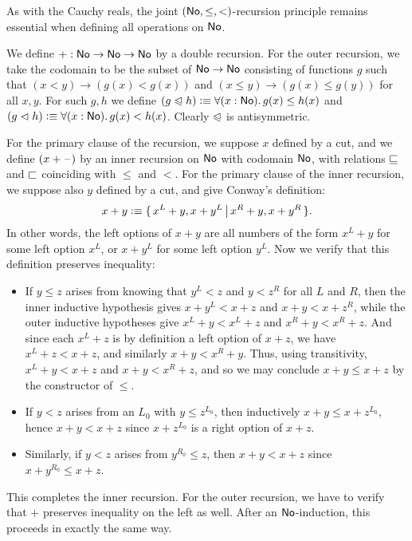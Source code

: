 As with the Cauchy reals, the joint $(\mathsf{No},\le,<)$-recursion principle remains essential when defining all operations on $\mathsf{No}$.

\begin{eg}
We define $\mathord+:\mathsf{No}\to\mathsf{No}\to\mathsf{No}$ by a double recursion.
For the outer recursion, we take the codomain to be the subset of $\mathsf{No}\to\mathsf{No}$ consisting of functions $g$ such that $(x<y) \to (g(x)<g(x))$ and $(x\le y) \to (g(x)\le g(y))$ for all $x,y$.
For such $g,h$ we define $(g\ble h)\defeq \fall{x:\NO} g(x)\le h(x)$ and $(g\blt h)\defeq \fall{x:\NO} g(x)< h(x)$.
Clearly $\trianglelefteqslant$ is antisymmetric.

For the primary clause of the recursion, we suppose $x$ defined by a cut, and we define $(x+\mathord{\hspace{1pt}\text{--}\hspace{1pt}})$ by an inner recursion on $\mathsf{No}$ with codomain $\mathsf{No}$, with relations $\sqsubseteq$ and $\sqsubset$ coinciding with $\le$ and $<$.
For the primary clause of the inner recursion, we suppose also $y$ defined by a cut, and give Conway's definition:
\[ x+y \vcentcolon\equiv \{\,x^L+y, x+y^L\,\big|\,x^R+y,x+y^R\,\}. \]
In other words, the left options of $x+y$ are all numbers of the form $x^L+y$ for some left option $x^L$, or $x+y^L$ for some left option $y^L$.
Now we verify that this definition preserves inequality:
\begin{itemize}
\item If $y\le z$ arises from knowing that $y^L<z$ and $y<z^R$ for all $L$ and $R$, then the inner inductive hypothesis gives $x+y^L<x+z$ and $x+y < x+z^R$, while the outer inductive hypotheses give $x^L+y < x^L+z$ and $x^R+ y < x^R+z$.
  And since each $x^L+z$ is by definition a left option of $x+z$, we have $x^L+z < x+z$, and similarly $x+y < x^R+y$.
  Thus, using transitivity, $x^L+y < x+z$ and $x+y < x^R+z$, and so we may conclude $x+y \le x+z$ by the constructor of $\le$.
\item If $y<z$ arises from an $L_0$ with $y\le z^{L_0}$, then inductively $x+y \le x+z^{L_0}$, hence $x+y<x+z$ since $x+z^{L_0}$ is a right option of $x+z$.
\item Similarly, if $y<z$ arises from $y^{R_0}\le z$, then $x+y<x+z$ since $x+y^{R_0}\le x+z$.
\end{itemize}
This completes the inner recursion.
For the outer recursion, we have to verify that $+$ preserves inequality on the left as well.
After an $\mathsf{No}$-induction, this proceeds in exactly the same way.
\end{eg}

